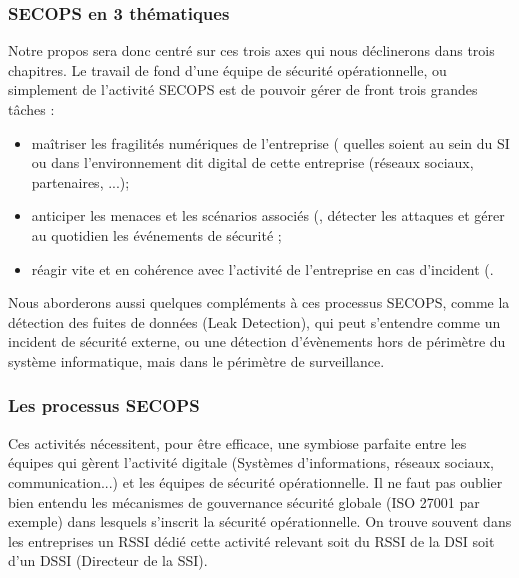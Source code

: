 \begin{frame}
\frametitle<presentation>{SECOPS en 3 thématiques}
Notre propos sera donc centré sur ces trois axes  qui nous déclinerons dans trois chapitres. Le travail de fond d'une équipe de sécurité opérationnelle, ou simplement de l'activité SECOPS est de pouvoir gérer de front trois grandes tâches : 
\begin{itemize}
 \item maîtriser les fragilités numériques de l'entreprise ( quelles soient au sein du SI ou dans l'environnement dit digital de cette entreprise (réseaux sociaux, partenaires, ...);
 \item anticiper les menaces et les scénarios associés (, détecter les attaques et gérer au quotidien les événements de sécurité ;
 \item réagir vite et en cohérence avec l'activité de l'entreprise en cas d'incident (.
\end{itemize}
\end{frame}

Nous aborderons aussi quelques compléments à ces processus SECOPS, comme la détection des fuites de données (Leak Detection), qui peut s'entendre comme un incident de sécurité externe, ou une détection d'évènements hors de périmètre du système informatique, mais dans le périmètre de surveillance.

\begin{frame}
\frametitle<presentation>{Les processus SECOPS}

\end{frame}

Ces activités nécessitent, pour être efficace, une symbiose parfaite entre les équipes qui gèrent l'activité digitale (Systèmes d'informations, réseaux sociaux,  communication...) et les équipes de sécurité opérationnelle.
Il ne faut pas oublier bien entendu les mécanismes de gouvernance sécurité globale (ISO 27001 par exemple) dans lesquels s'inscrit la sécurité opérationnelle. On trouve souvent dans les entreprises un RSSI dédié cette activité relevant soit du RSSI de la DSI soit d'un DSSI (Directeur de la SSI).

